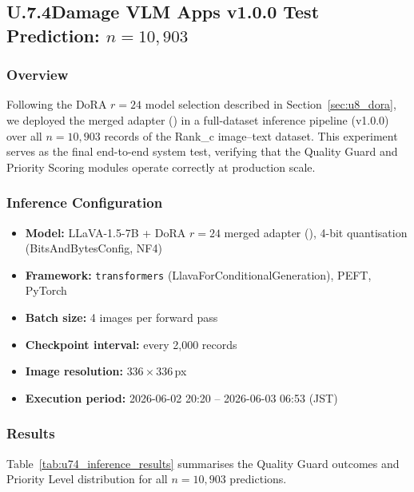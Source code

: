 \documentclass[onecolumn]{article}
\begin{document}
\subsection*{U.7.4\quad Damage VLM Apps v1.0.0 Test Prediction: $n{=}10{,}903$}
\label{sec:u74_v10_prediction}

\subsubsection*{Overview}

Following the DoRA $r{=}24$ model selection described in Section~\ref{sec:u8_dora},
we deployed the merged adapter () in a
full-dataset inference pipeline (v1.0.0) over all $n{=}10{,}903$ records of the
Rank\_c image--text dataset.
This experiment serves as the final end-to-end system test,
verifying that the Quality Guard and Priority Scoring modules operate correctly
at production scale.

\subsubsection*{Inference Configuration}

\begin{itemize}
  \item \textbf{Model:} LLaVA-1.5-7B + DoRA $r{=}24$ merged adapter
        (), 4-bit quantisation
        (BitsAndBytesConfig, NF4)
  \item \textbf{Framework:} \texttt{transformers} (LlavaForConditionalGeneration),
        PEFT, PyTorch
  \item \textbf{Batch size:} 4 images per forward pass
  \item \textbf{Checkpoint interval:} every 2{,}000 records
  \item \textbf{Image resolution:} $336 \times 336$\,px
  \item \textbf{Execution period:} 2026-06-02 20:20 -- 2026-06-03 06:53 (JST)
\end{itemize}

\subsubsection*{Results}

Table~\ref{tab:u74_inference_results} summarises the Quality Guard outcomes
and Priority Level distribution for all $n{=}10{,}903$ predictions.
\end{document}
